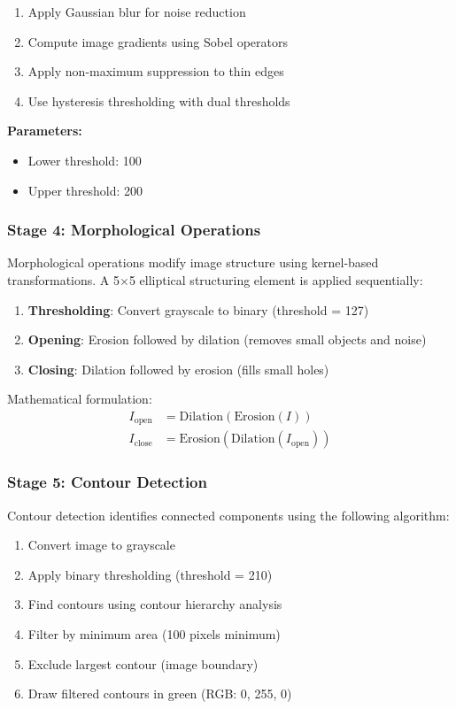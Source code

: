 \documentclass[12pt,a4paper]{article}
\begin{document}
\begin{enumerate}
    \item Apply Gaussian blur for noise reduction
    \item Compute image gradients using Sobel operators
    \item Apply non-maximum suppression to thin edges
    \item Use hysteresis thresholding with dual thresholds
\end{enumerate}

\textbf{Parameters:}
\begin{itemize}
    \item Lower threshold: 100
    \item Upper threshold: 200
\end{itemize}

\subsubsection{Stage 4: Morphological Operations}

Morphological operations modify image structure using kernel-based transformations. A 5×5 elliptical structuring element is applied sequentially:

\begin{enumerate}
    \item \textbf{Thresholding}: Convert grayscale to binary (threshold = 127)
    \item \textbf{Opening}: Erosion followed by dilation (removes small objects and noise)
    \item \textbf{Closing}: Dilation followed by erosion (fills small holes)
\end{enumerate}

Mathematical formulation:
\begin{align}
I_{\text{open}} &= \text{Dilation}(\text{Erosion}(I)) \\
I_{\text{close}} &= \text{Erosion}(\text{Dilation}(I_{\text{open}}))
\end{align}

\subsubsection{Stage 5: Contour Detection}

Contour detection identifies connected components using the following algorithm:

\begin{enumerate}
    \item Convert image to grayscale
    \item Apply binary thresholding (threshold = 210)
    \item Find contours using contour hierarchy analysis
    \item Filter by minimum area (100 pixels minimum)
    \item Exclude largest contour (image boundary)
    \item Draw filtered contours in green (RGB: 0, 255, 0)
\end{enumerate}
\end{document}
